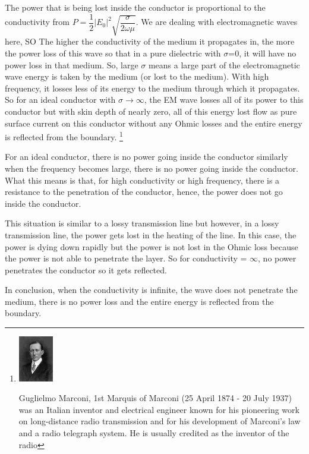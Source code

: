 The power that is being lost inside the conductor is proportional to the conductivity from $P=\dfrac{1}{2}\lvert E_{0}\rvert^{2}\sqrt{\dfrac{\sigma}{2\omega\mu}}$.
We are dealing with electromagnetic waves here, SO The higher the conductivity of the medium it propagates in, the more the power loss of this wave so that in a pure dielectric with $\sigma$=0, it will have no power loss in that medium. So, large $\sigma$ means a large part of the electromagnetic wave energy is taken by the medium (or lost to the medium). With high frequency, it losses less of its energy to the medium through which it propagates. So for an ideal conductor with $\sigma\longrightarrow\infty$, the EM wave losses all of its power to this conductor but with skin depth of nearly zero, all of this energy lost flow as pure surface current on this conductor without any Ohmic losses and the entire energy is reflected from the boundary.
\footnote{
\includegraphics[height=20mm]{./graphics/footnotegm.jpg}

Guglielmo Marconi, 1st Marquis of Marconi (25 April 1874 - 20 July 1937) was an Italian inventor and electrical engineer known for his pioneering work on long-distance radio transmission and for his development of Marconi's law and a radio telegraph system. He is usually credited as the inventor of the radio
}

For an ideal conductor, there is no power going inside the conductor similarly when the frequency becomes large, there is no power going inside the conductor. What this means is that, for high conductivity or high frequency, there is a resistance to the penetration of the conductor, hence, the power does not go inside the conductor.

This situation is similar to a lossy transmission line but however, in a lossy transmission line, the power gets lost in the heating of the line. In this case, the power is dying down rapidly but the power is not lost in the Ohmic loss because the power is not able to penetrate the layer. So for conductivity = $\infty$, no power penetrates the conductor so it gets reflected.

In conclusion, when the conductivity is infinite, the wave does not penetrate the medium, there is no power loss and the entire energy is reflected from the boundary.

